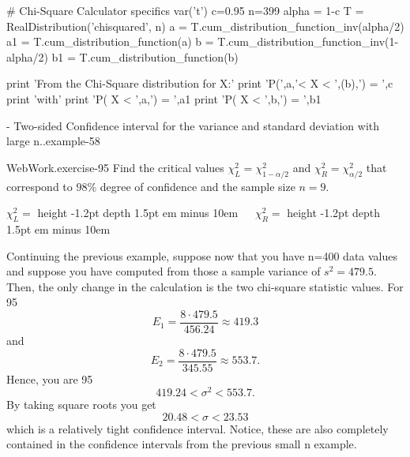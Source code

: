 \documentclass[10pt,]{book}
\newcommand{\fillin}[1]{\leavevmode\leaders\vrule height -1.2pt depth 1.5pt \hskip #1em minus #1em \null}
\numberwithin{equation}{section}
\newcommand{\lt}{<}
\begin{document}
\hypertarget{p-1415}{}%
\leavevmode%
\begin{sageinput}
# Chi-Square Calculator specifics
var('t')
c=0.95
n=399
alpha = 1-c
T = RealDistribution('chisquared', n)
a = T.cum_distribution_function_inv(alpha/2)
a1 = T.cum_distribution_function(a)
b = T.cum_distribution_function_inv(1-alpha/2)
b1 = T.cum_distribution_function(b)

print 'From the Chi-Square distribution for X:'
print 'P(',a,'< X < ',(b),') = ',c
print 'with'
print 'P( X < ',a,') = ',a1
print 'P( X < ',b,') = ',b1
\end{sageinput}
%
 \begin{example}{- Two-sided Confidence interval for the variance and standard deviation with large n..}{example-58}%
\hypertarget{p-1416}{}%
\begin{inlineexercise}{WebWork.}{exercise-95}%
\hypertarget{p-1417}{}%
Find the critical values \(\chi_L^2 = \chi_{1-\alpha/2}^2\) and \(\chi_R^2 = \chi_{\alpha/2}^2\) that correspond to \(98\)\% degree of confidence and the sample size \(n = 9.\)%
\par
\hypertarget{p-1418}{}%
\(\chi_L^2 =\)  \fillin{10} \(\ \ \ \ \) \(\chi_R^2 =\)  \fillin{10}%
\end{inlineexercise}
%
\par
\hypertarget{p-1419}{}%
Continuing the previous example, suppose now that you have n=400 data values and suppose you have computed from those a sample variance of \(s^2 = 479.5\).  Then, the only change in the calculation is the two chi-square statistic values. For 95%
\begin{equation*}
E_1 = \frac{8 \cdot 479.5}{456.24} \approx 419.3
\end{equation*}
and%
\begin{equation*}
E_2 = \frac{8 \cdot 479.5}{345.55} \approx 553.7.
\end{equation*}
Hence, you are 95%
\begin{equation*}
419.24 \lt \sigma^2 \lt 553.7.
\end{equation*}
By taking square roots you get%
\begin{equation*}
20.48 \lt \sigma \lt 23.53
\end{equation*}
which is a relatively tight confidence interval.  Notice, these are also completely contained in the confidence intervals from the previous small n example.%
\end{example}
\end{document}
